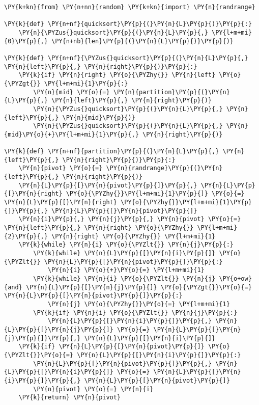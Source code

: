 \begin{Verbatim}[commandchars=\\\{\}]
\PY{k+kn}{from} \PY{n+nn}{random} \PY{k+kn}{import} \PY{n}{randrange}

\PY{k}{def} \PY{n+nf}{quicksort}\PY{p}{(}\PY{n}{L}\PY{p}{)}\PY{p}{:}
    \PY{n}{\PYZus{}quicksort}\PY{p}{(}\PY{n}{L}\PY{p}{,} \PY{l+m+mi}{0}\PY{p}{,} \PY{n+nb}{len}\PY{p}{(}\PY{n}{L}\PY{p}{)}\PY{p}{)}

\PY{k}{def} \PY{n+nf}{\PYZus{}quicksort}\PY{p}{(}\PY{n}{L}\PY{p}{,} \PY{n}{left}\PY{p}{,} \PY{n}{right}\PY{p}{)}\PY{p}{:}
    \PY{k}{if} \PY{n}{right} \PY{o}{\PYZhy{}} \PY{n}{left} \PY{o}{\PYZgt{}} \PY{l+m+mi}{1}\PY{p}{:}
        \PY{n}{mid} \PY{o}{=} \PY{n}{partition}\PY{p}{(}\PY{n}{L}\PY{p}{,} \PY{n}{left}\PY{p}{,} \PY{n}{right}\PY{p}{)}
        \PY{n}{\PYZus{}quicksort}\PY{p}{(}\PY{n}{L}\PY{p}{,} \PY{n}{left}\PY{p}{,} \PY{n}{mid}\PY{p}{)}
        \PY{n}{\PYZus{}quicksort}\PY{p}{(}\PY{n}{L}\PY{p}{,} \PY{n}{mid}\PY{o}{+}\PY{l+m+mi}{1}\PY{p}{,} \PY{n}{right}\PY{p}{)}

\PY{k}{def} \PY{n+nf}{partition}\PY{p}{(}\PY{n}{L}\PY{p}{,} \PY{n}{left}\PY{p}{,} \PY{n}{right}\PY{p}{)}\PY{p}{:}
    \PY{n}{pivot} \PY{o}{=} \PY{n}{randrange}\PY{p}{(}\PY{n}{left}\PY{p}{,} \PY{n}{right}\PY{p}{)}
    \PY{n}{L}\PY{p}{[}\PY{n}{pivot}\PY{p}{]}\PY{p}{,} \PY{n}{L}\PY{p}{[}\PY{n}{right} \PY{o}{\PYZhy{}}\PY{l+m+mi}{1}\PY{p}{]} \PY{o}{=} \PY{n}{L}\PY{p}{[}\PY{n}{right} \PY{o}{\PYZhy{}}\PY{l+m+mi}{1}\PY{p}{]}\PY{p}{,} \PY{n}{L}\PY{p}{[}\PY{n}{pivot}\PY{p}{]}
    \PY{n}{i}\PY{p}{,} \PY{n}{j}\PY{p}{,} \PY{n}{pivot} \PY{o}{=} \PY{n}{left}\PY{p}{,} \PY{n}{right} \PY{o}{\PYZhy{}} \PY{l+m+mi}{2}\PY{p}{,} \PY{n}{right} \PY{o}{\PYZhy{}} \PY{l+m+mi}{1}
    \PY{k}{while} \PY{n}{i} \PY{o}{\PYZlt{}} \PY{n}{j}\PY{p}{:}
        \PY{k}{while} \PY{n}{L}\PY{p}{[}\PY{n}{i}\PY{p}{]} \PY{o}{\PYZlt{}} \PY{n}{L}\PY{p}{[}\PY{n}{pivot}\PY{p}{]}\PY{p}{:}
            \PY{n}{i} \PY{o}{+}\PY{o}{=} \PY{l+m+mi}{1}
        \PY{k}{while} \PY{n}{i} \PY{o}{\PYZlt{}} \PY{n}{j} \PY{o+ow}{and} \PY{n}{L}\PY{p}{[}\PY{n}{j}\PY{p}{]} \PY{o}{\PYZgt{}}\PY{o}{=} \PY{n}{L}\PY{p}{[}\PY{n}{pivot}\PY{p}{]}\PY{p}{:}
            \PY{n}{j} \PY{o}{\PYZhy{}}\PY{o}{=} \PY{l+m+mi}{1}
        \PY{k}{if} \PY{n}{i} \PY{o}{\PYZlt{}} \PY{n}{j}\PY{p}{:}
            \PY{n}{L}\PY{p}{[}\PY{n}{i}\PY{p}{]}\PY{p}{,} \PY{n}{L}\PY{p}{[}\PY{n}{j}\PY{p}{]} \PY{o}{=} \PY{n}{L}\PY{p}{[}\PY{n}{j}\PY{p}{]}\PY{p}{,} \PY{n}{L}\PY{p}{[}\PY{n}{i}\PY{p}{]}
    \PY{k}{if} \PY{n}{L}\PY{p}{[}\PY{n}{pivot}\PY{p}{]} \PY{o}{\PYZlt{}}\PY{o}{=} \PY{n}{L}\PY{p}{[}\PY{n}{i}\PY{p}{]}\PY{p}{:}
        \PY{n}{L}\PY{p}{[}\PY{n}{pivot}\PY{p}{]}\PY{p}{,} \PY{n}{L}\PY{p}{[}\PY{n}{i}\PY{p}{]} \PY{o}{=} \PY{n}{L}\PY{p}{[}\PY{n}{i}\PY{p}{]}\PY{p}{,} \PY{n}{L}\PY{p}{[}\PY{n}{pivot}\PY{p}{]}
        \PY{n}{pivot} \PY{o}{=} \PY{n}{i}
    \PY{k}{return} \PY{n}{pivot}
\end{Verbatim}
